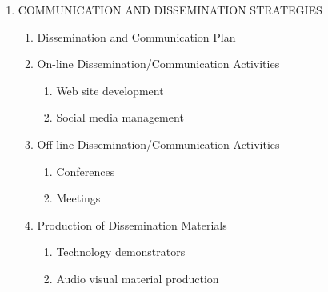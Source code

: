 \begin{enumerate}[label*=\arabic*.]
	\item COMMUNICATION AND DISSEMINATION STRATEGIES
	
	\begin{enumerate}[label*=\arabic*.]
		\item Dissemination and Communication Plan
		\item On-line Dissemination/Communication Activities
		\begin{enumerate}[label*=\arabic*.]
			\item Web site development
			\item Social media management
		\end{enumerate}
		\item Off-line Dissemination/Communication Activities
		\begin{enumerate}[label*=\arabic*.]
			\item Conferences
			\item Meetings
		\end{enumerate}
		\item Production of Dissemination Materials
		\begin{enumerate}[label*=\arabic*.]
			\item Technology demonstrators
			\item Audio visual material production
		\end{enumerate}
	\end{enumerate}
	
\end{enumerate}


